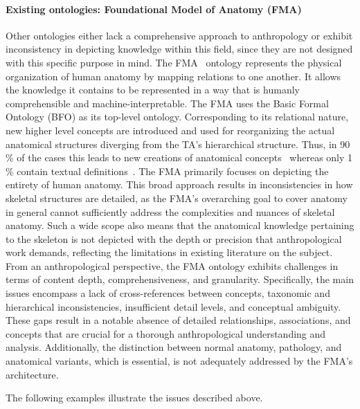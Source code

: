 \documentclass[sw]{iosart2x}
\begin{document}
\paragraph{Existing ontologies: Foundational Model of Anatomy (FMA)}\label{sec:OntologiesFMA}
Other ontologies either lack a comprehensive approach to anthropology or exhibit inconsistency in depicting knowledge within this field, since they are not designed with this specific purpose in mind.
The FMA~\citep{fma} ontology represents the physical organization of human anatomy by mapping relations to one another.
It allows the knowledge it contains to be represented in a way that is humanly comprehensible and machine-interpretable.
The FMA uses the Basic Formal Ontology (BFO) as its top-level ontology.
Corresponding to its relational nature, new higher level concepts are introduced and used for reorganizing the actual anatomical structures diverging from the TA's hierarchical structure.
Thus, in 90\,\% of the cases this leads to new creations of anatomical concepts~\citep{anatomicalterms} whereas only 1\,\% contain textual definitions~\citep{uberon}.
The FMA primarily focuses on depicting the entirety of human anatomy.
This broad approach results in inconsistencies in how skeletal structures are detailed, as the FMA's overarching goal to cover anatomy in general cannot sufficiently address the complexities and nuances of skeletal anatomy.
Such a wide scope also means that the anatomical knowledge pertaining to the skeleton is not depicted with the depth or precision that anthropological work demands, reflecting the limitations in existing literature on the subject.
From an anthropological perspective, the FMA ontology exhibits challenges in terms of content depth, comprehensiveness, and granularity.
Specifically, the main issues encompass a lack of cross-references between concepts, taxonomic and hierarchical inconsistencies, insufficient detail levels, and conceptual ambiguity.
These gaps result in a notable absence of detailed relationships, associations, and concepts that are crucial for a thorough anthropological understanding and analysis.
Additionally, the distinction between normal anatomy, pathology, and anatomical variants, which is essential, is not adequately addressed by the FMA's architecture.

The following examples illustrate the issues described above.
\end{document}
